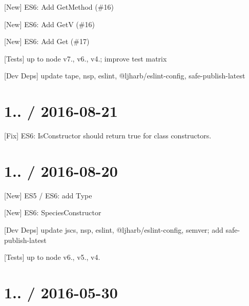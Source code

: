 
\begin{DoxyItemize}
\item \mbox{[}New\mbox{]} E\+S6\+: Add {\ttfamily Get\+Method} (\#16)
\item \mbox{[}New\mbox{]} E\+S6\+: Add {\ttfamily GetV} (\#16)
\item \mbox{[}New\mbox{]} E\+S6\+: Add {\ttfamily Get} (\#17)
\item \mbox{[}Tests\mbox{]} up to {\ttfamily node} {\ttfamily v7.}, {\ttfamily v6.}, {\ttfamily v4.}; improve test matrix
\item \mbox{[}Dev Deps\mbox{]} update {\ttfamily tape}, {\ttfamily nsp}, {\ttfamily eslint}, {\ttfamily @ljharb/eslint-\/config}, {\ttfamily safe-\/publish-\/latest}
\end{DoxyItemize}

\section*{1.. / 2016-\/08-\/21 }


\begin{DoxyItemize}
\item \mbox{[}Fix\mbox{]} E\+S6\+: Is\+Constructor should return true for {\ttfamily class} constructors.
\end{DoxyItemize}

\section*{1.. / 2016-\/08-\/20 }


\begin{DoxyItemize}
\item \mbox{[}New\mbox{]} E\+S5 / E\+S6\+: add {\ttfamily Type}
\item \mbox{[}New\mbox{]} E\+S6\+: {\ttfamily Species\+Constructor}
\item \mbox{[}Dev Deps\mbox{]} update {\ttfamily jscs}, {\ttfamily nsp}, {\ttfamily eslint}, {\ttfamily @ljharb/eslint-\/config}, {\ttfamily semver}; add {\ttfamily safe-\/publish-\/latest}
\item \mbox{[}Tests\mbox{]} up to {\ttfamily node} {\ttfamily v6.}, {\ttfamily v5.}, {\ttfamily v4.}
\end{DoxyItemize}

\section*{1.. / 2016-\/05-\/30 }


